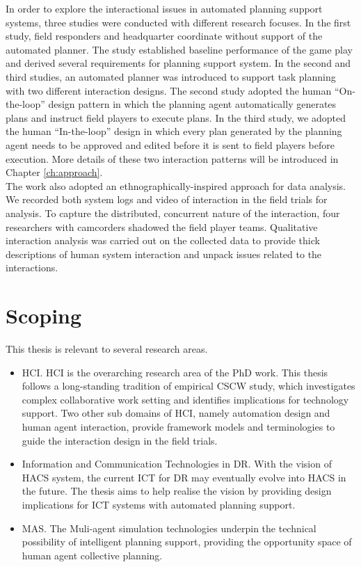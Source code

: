 In order to explore the interactional issues in automated planning support systems, three studies were conducted with different research focuses. In the first study, field responders and headquarter coordinate without support of the automated planner. The study established baseline performance of the game play and derived several requirements for planning support system. In the second and third studies, an automated planner was introduced to support task planning with two different interaction designs. The second study adopted the human ``On-the-loop'' design pattern in which the planning agent automatically generates plans and instruct field players to execute plans. In the third study, we adopted the human ``In-the-loop'' design in which every plan generated by the planning agent needs to be approved and edited before it is sent to field players before execution. More details of these two interaction patterns will be introduced in Chapter \ref{ch:approach}.\\

The work also adopted an ethnographically-inspired approach for data analysis. We recorded both system logs and video of interaction in the field trials for analysis. To capture the distributed, concurrent nature of the interaction, four researchers with camcorders shadowed the field player teams. Qualitative interaction analysis was carried out on the collected data to provide thick descriptions of human system interaction and unpack issues related to the interactions.\\


\section{Scoping}\label{sec:custom}
This thesis is relevant to several research areas. \\

\begin{itemize} 
  \item \acf{HCI}. \ac{HCI} is the overarching research area of the PhD work. This thesis follows a long-standing tradition of empirical \ac{CSCW} study, which investigates complex  collaborative work setting and identifies implications for technology support. Two other sub domains of \ac{HCI}, namely automation design and human agent interaction, provide framework models and terminologies to guide the interaction design in the field trials.
  \item Information and Communication Technologies in \ac{DR}. With the vision of \ac{HACS} system, the current \ac{ICT} for \ac{DR} may eventually evolve into \ac{HACS} in the future. The thesis aims to help realise the vision by providing design implications for \ac{ICT} systems with automated planning support. 
  \item \acf{MAS}. The Muli-agent simulation technologies underpin the technical possibility of intelligent planning support, providing the opportunity space of human agent collective planning. 
\end{itemize}

